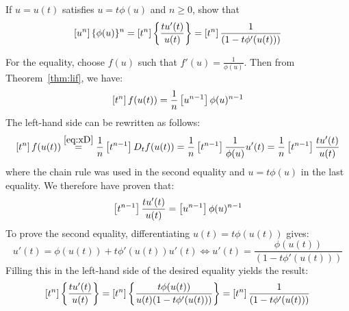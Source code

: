 \begin{exercise}
    \label{ex:5-3}
    If $u=u(t)$ satisfies $u=t\phi(u)$ and $n\geq0$, show that 
    \[
        \left[u^n\right]\{\phi(u)\}^n = \left[t^n\right]\left\{\frac{tu'(t)}{u(t)} \right\} = \left[t^n\right]\frac{1}{(1-t\phi'(u(t)))}
    \]
\end{exercise}
\begin{solution}
    For the equality, choose $f(u)$ such that $f'(u) = \frac{1}{\phi(u)}$. Then from Theorem~\ref{thm:lif}, we have:
    \[
        \left[t^n\right] f(u(t)) = \frac{1}{n}\left[u^{n-1}\right] \phi(u)^{n-1}
    \]
    The left-hand side can be rewritten as follows:
    \[
        \left[t^n\right] f(u(t)) \overset{\eqref{eq:xD}}{=} \frac{1}{n} \left[t^{n-1}\right] D_t f(u(t)) = \frac{1}{n} \left[t^{n-1}\right] \frac{1}{\phi(u)} u'(t) = \frac{1}{n} \left[t^{n-1}\right] \frac{tu'(t)}{u(t)}
    \]
    where the chain rule was used in the second equality and $u=t\phi(u)$ in the last equality. We therefore have proven that:
    \[
        \left[t^{n-1}\right] \frac{tu'(t)}{u(t)} = \left[u^{n-1}\right] \phi(u)^{n-1}
    \]
    To prove the second equality, differentiating $u(t) = t\phi(u(t))$ gives:
    \[
        u'(t) = \phi(u(t)) + t\phi'(u(t))u'(t) \Longleftrightarrow u'(t) = \frac{\phi(u(t))}{(1-t\phi'(u(t)))}
    \]
    Filling this in the left-hand side of the desired equality yields the result:
    \[
        \left[t^n\right]\left\{\frac{tu'(t)}{u(t)} \right\} = \left[t^n\right] \left\{\frac{t\phi(u(t))}{u(t)(1-t\phi'(u(t)))} \right\} = \left[t^n\right]\frac{1}{(1-t\phi'(u(t)))}
    \]
\end{solution}

